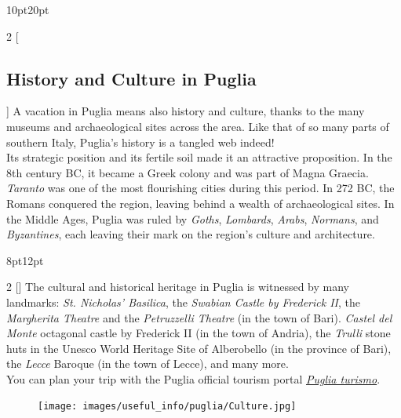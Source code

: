 \documentclass[
	openany, %
	parskip=full, %
	12pt, %
	a4paper, %
]{conferencebooklet} %
\begin{document}
\vspace{-2mm}
\begin{adjustwidth}{10pt}{20pt}
\begin{multicols}{2}
[\subsection*{History and Culture in Puglia}]
A vacation in Puglia means also history and culture, thanks to the many museums and archaeological sites across the area. Like that of so many parts of southern Italy, Puglia's history is a tangled web indeed! \\
Its strategic position and its fertile soil made it an attractive proposition. In the 8th century BC, it became a Greek colony and was part of Magna Graecia. \textit{Taranto} was one of the most flourishing cities during this period. In 272 BC, the Romans conquered the region, leaving behind a wealth of archaeological sites. In the Middle Ages, Puglia was ruled by \textit{Goths}, \textit{Lombards}, \textit{Arabs}, \textit{Normans}, and \textit{Byzantines}, each leaving their mark on the region’s culture and architecture.
\end{multicols}
\end{adjustwidth}

\begin{adjustwidth}{8pt}{12pt}
\begin{multicols}{2}
[]
The cultural and historical heritage in Puglia is witnessed by many landmarks: \textit{St. Nicholas’ Basilica}, the \textit{Swabian Castle by Frederick II}, the \textit{Margherita Theatre} and the \textit{Petruzzelli Theatre} (in the town of Bari). \textit{Castel del Monte} octagonal castle by Frederick II (in the town of Andria), the \textit{Trulli} stone huts in the Unesco World Heritage Site of Alberobello (in the province of Bari), the \textit{Lecce} Baroque (in the town of Lecce), and many more. \\
You can plan your trip with the Puglia official tourism portal \color{blue}\href{https://www.viaggiareinpuglia.it/en/homepage}{\textit{Puglia turismo}}\color{black}.
\end{multicols}

\vspace{-4mm}
\begin{figure}[h!]
    \centering
    \texttt{[image: images/useful\_info/puglia/Culture.jpg]}
\end{figure}
\end{adjustwidth}
\end{document}
